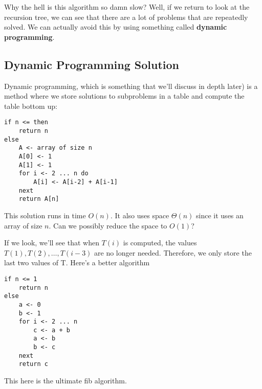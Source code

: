 \documentclass[11pt,a4paper,titlepage,dvipsnames,cmyk]{scrartcl}
\begin{document}
Why the hell is this algorithm so damn slow? Well, if we return to look at
the recursion tree, we can see that there are a lot of problems that are
repeatedly solved. We can actually avoid this by using something called
\textbf{dynamic programming}.

\subsection{Dynamic Programming Solution}%
\label{sub:Dynamic Programming Solution}
Dynamic programming, which is something that we'll discuss in depth later)
is a method where we store solutions to subproblems in a table and compute
the table bottom up:

\begin{lstlisting}
if n <= then
    return n
else
    A <- array of size n
    A[0] <- 1
    A[1] <- 1
    for i <- 2 ... n do
        A[i] <- A[i-2] + A[i-1]
    next
    return A[n]
\end{lstlisting}

This solution runs in time $O(n)$. It also uses space $\Theta(n)$ since it
uses an array of size $n$. Can we possibly reduce the space to $O(1)$?

If we look, we'll see that when $T(i)$ is computed, the values $T(1),
T(2), \dots, T(i-3)$ are no longer needed. Therefore, we only store the
last two values of T. Here's a better algorithm

\begin{lstlisting}
if n <= 1
    return n
else
    a <- 0
    b <- 1
    for i <- 2 ... n
        c <- a + b
        a <- b
        b <- c
    next
    return c
\end{lstlisting}

This here is the ultimate fib algorithm.
\end{document}
